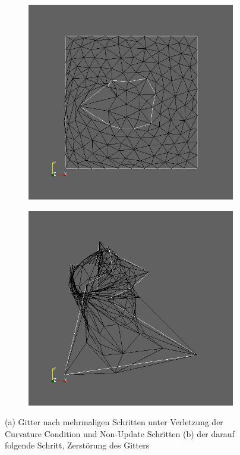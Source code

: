 \begin{figure}
	\begin{subfigure}{0.5\textwidth}
	\centering
	\includegraphics[scale=0.25]{pic_smallcircle_destroyed1.jpg}
	\caption{}	
	\end{subfigure}
	\begin{subfigure}{0.5\textwidth}
	\centering
	\includegraphics[scale=0.25]{pic_smallcircle_destroyed2.jpg}
	\caption{}	
	\end{subfigure}
\caption{(a) Gitter nach mehrmaligen Schritten unter Verletzung der Curvature Condition und Non-Update Schritten (b) der darauf folgende Schritt, Zerstörung des Gitters}
\label{Destroyedbfgs_grob}
\end{figure}

